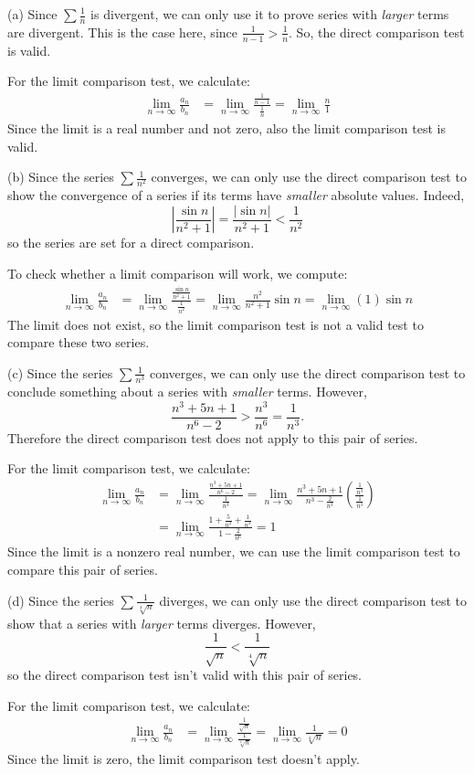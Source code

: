 \begin{solution}
(a) Since $\sum \frac{1}{n}$ is divergent, we can only use it to prove series with \emph{larger} terms are divergent. This is the case here, since $\frac{1}{n-1}>\frac{1}{n}$. So, the direct comparison test is valid.

For the limit comparison test, we calculate:
\begin{align*}
\lim_{n \to \infty}\frac{a_n}{b_n}&=\lim_{n \to \infty}\frac{\frac{1}{n-1}}{\frac{1}{n}}=\lim_{n \to \infty}\frac{n}{1}
\end{align*}
Since the limit is a real number and not zero, also the limit comparison test is valid.

(b) Since the series $\sum \frac{1}{n^2}$ converges, we can only use the direct comparison test to show the convergence of a series if its terms have \emph{smaller} absolute values. Indeed,
\[\left| \frac{\sin n}{n^2+1}\right|=\frac{|\sin n|}{n^2+1}<\frac{1}{n^2}\]
so the series are set for a direct comparison.

To check whether a limit comparison will work, we compute:
\begin{align*}
\lim_{n \to \infty}\frac{a_n}{b_n}&=\lim_{n \to \infty} \frac{\frac{\sin n}{n^2+1}}{\frac{1}{n^2}} = \lim_{n \to \infty}\frac{n^2}{n^2+1}\sin n = \lim_{n \to \infty}(1)\sin n
\end{align*}
The limit does not exist, so the limit comparison test is not a valid test to compare these two series.

(c) Since the series $\sum \frac{1}{n^3}$ converges, we can only use the direct comparison test to conclude something about a series with \emph{smaller} terms. However, \[\frac{n^3+5n+1}{n^6-2}>\frac{n^3}{n^6}=\frac{1}{n^3}.\]
Therefore the direct comparison test does not apply to this pair of series.

For the limit comparison test, we calculate:
\begin{align*}
\lim_{n \to \infty}\frac{a_n}{b_n}&=\lim_{n \to \infty}\frac{\frac{n^3+5n+1}{n^6-2}}{  \frac{1}{n^3}} = \lim_{n \to \infty}\frac{n^3+5n+1}{n^3-\frac{2}{n^3}}\left(\frac{\frac{1}{n^3}}{\frac{1}{n^3}}\right)\\
&=\lim_{n \to \infty}\frac{1+\frac{5}{n^2}+\frac{1}{n^3}}{1-\frac{2}{n^6}}=1
\end{align*}
Since the limit is a nonzero real number, we can use the limit comparison test to compare this pair of series.

(d) Since the series $\sum \frac{1}{\sqrt[4]{n}}$ diverges, we can only use the direct comparison test to show that a series with \emph{larger} terms diverges. However,
\[\frac{1}{\sqrt{n}}<\frac{1}{\sqrt[4]{n}}\]
so the direct comparison test isn't valid with this pair of series.

For the limit comparison test, we calculate:
\begin{align*}
\lim_{n \to \infty}\frac{a_n}{b_n}&=\lim_{n \to \infty}\frac{\frac{1}{\sqrt{n}}}{\frac{1}{\sqrt[4]{n}}}=\lim_{n \to \infty}\frac{1}{\sqrt[4]{n}}=0
\end{align*}
Since the limit is zero, the limit comparison test doesn't apply.
\end{solution}
